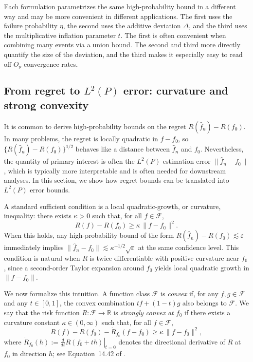 \documentclass[11pt]{article}
\theoremstyle{plain}
\theoremstyle{definition} %
\begin{document}
Each formulation parametrizes the same high-probability bound in a different way and may be more convenient in different applications. The first uses the failure probability \(\eta\), the second uses the additive deviation \(\Delta\), and the third uses the multiplicative inflation parameter \(t\). The first is often convenient when combining many events via a union bound. The second and third more directly quantify the size of the deviation, and the third makes it especially easy to read off \(O_p\) convergence rates. 


\subsection{From regret to $L^2(P)$ error: curvature and strong convexity}
\label{sec::ell2}

It is common to derive high-probability bounds on the regret
\(R(\hat f_n)-R(f_0)\). In many problems, the regret is locally quadratic in
\(f-f_0\), so \(\{R(\hat f_n)-R(f_0)\}^{1/2}\) behaves like a distance between
\(\hat f_n\) and \(f_0\). Nevertheless, the quantity of primary interest is
often the \(L^2(P)\) estimation error \(\|\hat f_n-f_0\|\), which is typically
more interpretable and is often needed for downstream analyses. In this
section, we show how regret bounds can be translated into \(L^2(P)\) error
bounds.

A standard sufficient condition is a local quadratic-growth, or curvature,
inequality: there exists \(\kappa>0\) such that, for all \(f\in\mathcal F\),
\[
R(f)-R(f_0)\ge \kappa\,\|f-f_0\|^2.
\]
When this holds, any high-probability bound of the form
\(R(\hat f_n)-R(f_0)\lesssim \varepsilon\) immediately implies
\(\|\hat f_n-f_0\| \lesssim \kappa^{-1/2}\sqrt{\varepsilon}\) at the same
confidence level. This condition is natural when \(R\) is twice
differentiable with positive curvature near \(f_0\), since a second-order
Taylor expansion around \(f_0\) yields local quadratic growth in
\(\|f-f_0\|\).

We now formalize this intuition. A function class \(\mathcal F\) is
\emph{convex} if, for any \(f,g\in\mathcal F\) and any \(t\in[0,1]\), the
convex combination \(tf+(1-t)g\) also belongs to \(\mathcal F\). We say that
the risk function \(R:\mathcal F\to\mathbb R\) is \emph{strongly convex at
\(f_0\)} if there exists a curvature constant \(\kappa\in(0,\infty)\) such
that, for all \(f\in\mathcal F\),
\[
R(f)-R(f_0)-\dot R_{f_0}(f-f_0) \ge \kappa\,\|f-f_0\|^2,
\]
where \(\dot R_{f_0}(h):=\left.\frac{d}{dt}R(f_0+th)\right|_{t=0}\) denotes
the directional derivative of \(R\) at \(f_0\) in direction \(h\); see
Equation~14.42 of \citealp{wainwright2019high}.
\end{document}

